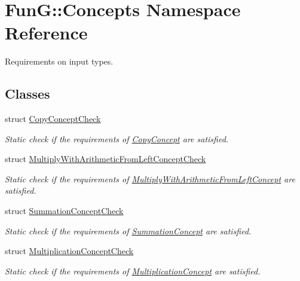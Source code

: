 \hypertarget{namespaceFunG_1_1Concepts}{\section{Fun\-G\-:\-:Concepts Namespace Reference}
\label{namespaceFunG_1_1Concepts}
}


Requirements on input types.  


\subsection*{Classes}
\begin{DoxyCompactItemize}
\item 
struct \hyperlink{structFunG_1_1Concepts_1_1CopyConceptCheck}{Copy\-Concept\-Check}
\begin{DoxyCompactList}\small\item\em Static check if the requirements of \hyperlink{structFunG_1_1Concepts_1_1CopyConcept}{Copy\-Concept} are satisfied. \end{DoxyCompactList}\item 
struct \hyperlink{structFunG_1_1Concepts_1_1MultiplyWithArithmeticFromLeftConceptCheck}{Multiply\-With\-Arithmetic\-From\-Left\-Concept\-Check}
\begin{DoxyCompactList}\small\item\em Static check if the requirements of \hyperlink{structFunG_1_1Concepts_1_1MultiplyWithArithmeticFromLeftConcept}{Multiply\-With\-Arithmetic\-From\-Left\-Concept} are satisfied. \end{DoxyCompactList}\item 
struct \hyperlink{structFunG_1_1Concepts_1_1SummationConceptCheck}{Summation\-Concept\-Check}
\begin{DoxyCompactList}\small\item\em Static check if the requirements of \hyperlink{structFunG_1_1Concepts_1_1SummationConcept}{Summation\-Concept} are satisfied. \end{DoxyCompactList}\item 
struct \hyperlink{structFunG_1_1Concepts_1_1MultiplicationConceptCheck}{Multiplication\-Concept\-Check}
\begin{DoxyCompactList}\small\item\em Static check if the requirements of \hyperlink{structFunG_1_1Concepts_1_1MultiplicationConcept}{Multiplication\-Concept} are satisfied. \end{DoxyCompactList}\item 

\end{DoxyCompactItemize}
